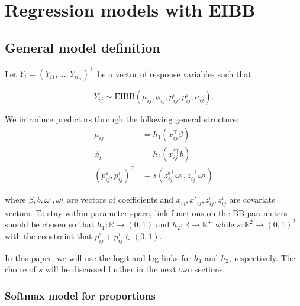 \chapter{Regression models with EIBB}
\label{cap:model}

\section{General model definition}
\label{sec:defmodel}

Let $Y_i = \left(Y_{i1}, ... , Y_{in_i}\right)^\top$ be a vector of response variables such that

\begin{equation}
Y_{ij} \sim \mathrm{EIBB}(\mu_{ij}, \phi_{ij}, p^{_0}_{ij}, p^{_1}_{ij}; n_{ij}).
\label{obseibb}
\end{equation}
	
We introduce predictors through the following general structure:
\begin{equation}
\begin{split}
\mu_{ij} &= h_1(x_{ij}^\top \beta)\\
\phi_i &= h_2(x_{ij}^{'\top} b)\\
(p_{ij}^{_0}, p_{ij}^{_1})^\top &= s(z_{ij}^{_0\top} \omega^{_0}, z_{ij}^{_1\top} \omega^{_1})
\end{split}
\label{enlaces}
\end{equation}

where $\beta, b, \omega^{_0}, \omega^{_1}$ are vectors of coefficients and $x_{ij}, x'_{ij}, z_{ij}^{_0}, z_{ij}^{_1}$ are covariate vectors. To stay within parameter space, link functions on the BB parameters should be chosen so that $h_1: \mathbb R \to (0,1)$ and $h_2: \mathbb R \to \mathbb R^+$ while $s: \mathbb R^2 \to (0,1)^2$  with the constraint that $p_{ij}^{_0}+ p_{ij}^{_1} \in (0,1)$.

In this paper, we will use the logit and log links for $h_1$ and $h_2$, respectively. The choice of $s$ will be discussed further in the next two sections.

\subsection{Softmax model for proportions}
\label{sec:softmaxp}

